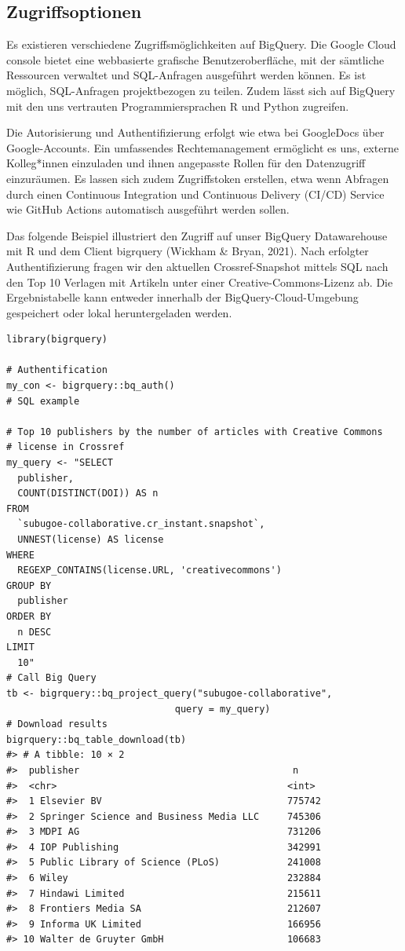 \documentclass[a4paper,
fontsize=11pt,
oneside,
numbers=noperiodatend,
parskip=half-,
bibliography=totoc,
final
]{scrartcl}
\begin{document}
\hypertarget{zugriffsoptionen}{%
\subsection{Zugriffsoptionen}\label{zugriffsoptionen}}

Es existieren verschiedene Zugriffsmöglichkeiten auf BigQuery. Die
Google Cloud console bietet eine webbasierte grafische
Benutzeroberfläche, mit der sämtliche Ressourcen verwaltet und
SQL-Anfragen ausgeführt werden können. Es ist möglich, SQL-Anfragen
projektbezogen zu teilen. Zudem lässt sich auf BigQuery mit den uns
vertrauten Programmiersprachen R und Python zugreifen.

Die Autorisierung und Authentifizierung erfolgt wie etwa bei GoogleDocs
über Google-Accounts. Ein umfassendes Rechtemanagement ermöglicht es
uns, externe Kolleg*innen einzuladen und ihnen angepasste Rollen für den
Datenzugriff einzuräumen. Es lassen sich zudem Zugriffstoken erstellen,
etwa wenn Abfragen durch einen Continuous Integration und Continuous
Delivery (CI/CD) Service wie GitHub Actions automatisch ausgeführt
werden sollen.

Das folgende Beispiel illustriert den Zugriff auf unser BigQuery
Datawarehouse mit R und dem Client bigrquery (Wickham \& Bryan, 2021).
Nach erfolgter Authentifizierung fragen wir den aktuellen
Crossref-Snapshot mittels SQL nach den Top 10 Verlagen mit Artikeln
unter einer Creative-Commons-Lizenz ab. Die Ergebnistabelle kann
entweder innerhalb der BigQuery-Cloud-Umgebung gespeichert oder lokal
heruntergeladen werden.

\begin{verbatim}
library(bigrquery)
 
# Authentification
my_con <- bigrquery::bq_auth()
# SQL example
 
# Top 10 publishers by the number of articles with Creative Commons
# license in Crossref
my_query <- "SELECT
  publisher,
  COUNT(DISTINCT(DOI)) AS n
FROM
  `subugoe-collaborative.cr_instant.snapshot`,
  UNNEST(license) AS license
WHERE
  REGEXP_CONTAINS(license.URL, 'creativecommons')
GROUP BY
  publisher
ORDER BY
  n DESC
LIMIT
  10"
# Call Big Query
tb <- bigrquery::bq_project_query("subugoe-collaborative",
                              query = my_query)
# Download results
bigrquery::bq_table_download(tb)
#> # A tibble: 10 × 2
#>  publisher                                      n
#>  <chr>                                         <int>
#>  1 Elsevier BV                                 775742
#>  2 Springer Science and Business Media LLC     745306
#>  3 MDPI AG                                     731206
#>  4 IOP Publishing                              342991
#>  5 Public Library of Science (PLoS)            241008
#>  6 Wiley                                       232884
#>  7 Hindawi Limited                             215611
#>  8 Frontiers Media SA                          212607
#>  9 Informa UK Limited                          166956
#> 10 Walter de Gruyter GmbH                      106683
\end{verbatim}
\end{document}
